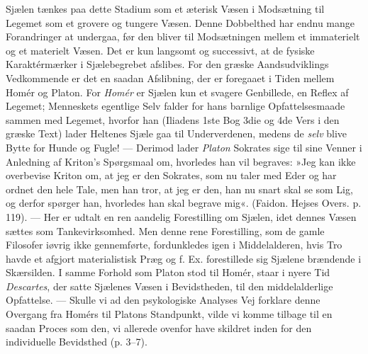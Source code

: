 \documentclass[12pt,a4paper,openany]{book}
\newcommand{\opage}[1]{\marginnote{\footnotesize\textit{[#1]}}}
\begin{document}
\opage{10}Sjælen tænkes paa dette Stadium som et æterisk Væsen i
Modsætning til Legemet som et grovere og tungere Væsen. Denne Dobbelthed
har endnu mange Forandringer at undergaa, før den bliver til
Modsætningen mellem et immaterielt og et materielt Væsen. Det er kun
langsomt og successivt, at de fysiske Karaktérmærker i Sjælebegrebet
afslibes. For den græske Aandsudviklings Vedkommende er det en saadan
Afslibning, der er foregaaet i Tiden mellem Homér og Platon. For
\emph{Homér} er Sjælen kun et svagere Genbillede, en Reflex af Legemet;
Menneskets egentlige Selv falder for hans barnlige Opfattelsesmaade
sammen med Legemet, hvorfor han (Iliadens 1ste Bog 3die og 4de Vers i
den græske Text) lader Heltenes Sjæle gaa til Underverdenen, medens de
\emph{selv} blive Bytte for Hunde og Fugle! --- Derimod lader
\emph{Platon} Sokrates sige til sine Venner i Anledning af Kriton’s
Spørgsmaal om, hvorledes han vil begraves: »Jeg kan ikke overbevise
Kriton om, at jeg er den Sokrates, som nu taler med Eder og har ordnet
den hele Tale, men han tror, at jeg er den, han nu snart skal se som
Lig, og derfor spørger han, hvorledes han skal begrave mig«. (Faidon.
Hejses Overs. p. 119). --- Her er udtalt en ren aandelig Forestilling om
Sjælen, idet dennes Væsen sættes som Tankevirksomhed. Men denne rene
Forestilling, som de gamle Filosofer iøvrig ikke gennemførte,
fordunkledes igen i Middelalderen, hvis Tro havde et afgjort
materialistisk Præg og f. Ex. forestillede sig Sjælene brændende i
Skærsilden. I samme Forhold som Platon stod til Homér, staar i nyere Tid
\emph{Descartes}, der satte Sjælenes Væsen i Bevidstheden, til den
middelalderlige Opfattelse. --- Skulle vi ad den psykologiske Analyses
Vej forklare denne Overgang fra Homérs til Platons Standpunkt, vilde vi
komme tilbage til en saadan Proces som den, vi allerede ovenfor have
skildret inden for den individuelle Bevidsthed (p. 3--7).
\end{document}
